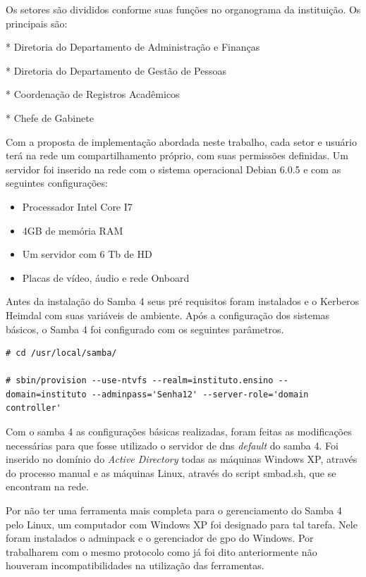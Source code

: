 \pagebreak
          				
Os setores são divididos conforme suas funções no organograma da instituição. Os principais são:

* Diretoria do Departamento de Administração e Finanças

* Diretoria do Departamento de Gestão de Pessoas

* Coordenação de Registros Acadêmicos

* Chefe de Gabinete

Com a proposta de implementação abordada neste trabalho, cada setor e usuário terá na rede um compartilhamento próprio, com suas permissões definidas. Um servidor foi inserido na rede com o sistema operacional Debian 6.0.5 e com as seguintes configurações:

\begin{itemize}
	\item{Processador Intel Core I7\textregistered}
	\item{4GB de memória RAM}
	\item{Um servidor com 6 Tb de HD}
	\item{Placas de vídeo, áudio e rede Onboard}
\end{itemize}

Antes da instalação do Samba 4 seus pré requisitos foram instalados e o Kerberos Heimdal com suas variáveis de ambiente.
Após a configuração dos sistemas básicos, o Samba 4 foi configurado com os seguintes parâmetros.\\

\begin{lstlisting}
# cd /usr/local/samba/

# sbin/provision --use-ntvfs --realm=instituto.ensino --domain=instituto --adminpass='Senha12' --server-role='domain controller'
\end{lstlisting}

Com o samba 4 as configurações básicas realizadas, foram feitas as modificações necessárias para que fosse utilizado o servidor de dns \textit{default} do samba 4. Foi inserido no domínio do \textit{Active Directory} todas as máquinas Windows XP, através do processo manual e as máquinas Linux, através do script smbad.sh, que se encontram na rede.

Por não ter uma ferramenta mais completa para o gerenciamento do Samba 4 pelo Linux, um computador com Windows XP foi designado para tal tarefa. Nele foram instalados o adminpack e o gerenciador de gpo do Windows. Por trabalharem com o mesmo protocolo como já foi dito anteriormente não houveram incompatibilidades na utilização das ferramentas.

